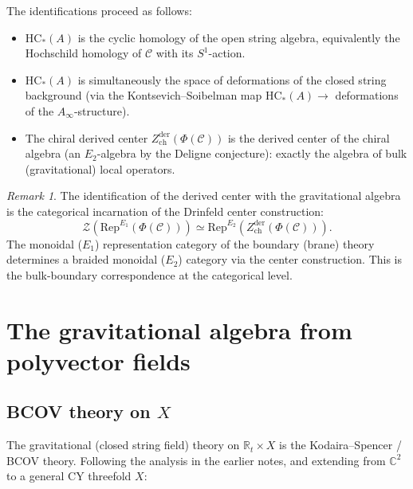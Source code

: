 \documentclass[11pt]{article}
\theoremstyle{definition}
\theoremstyle{remark}
\newtheorem{remark}[theorem]{Remark}
\newcommand{\HC}{\mathrm{HC}}
\newcommand{\Ainf}{A_\infty}
\newcommand{\Rep}{\mathrm{Rep}}
\newcommand{\cC}{\mathcal{C}}
\newcommand{\cZ}{\mathcal{Z}}
\newcommand{\Etwo}{E_2}
\begin{document}
The identifications proceed as follows:
\begin{itemize}
 \item $\HC_*(A)$ is the cyclic homology of the open string algebra,
 equivalently the Hochschild homology of $\cC$ with its $S^1$-action.
 \item $\HC_*(A)$ is simultaneously the space of deformations of the closed
 string background (via the Kontsevich--Soibelman map $\HC_*(A) \to$
 deformations of the $\Ainf$-structure).
 \item The chiral derived center $Z^{\mathrm{der}}_{\mathrm{ch}}(\Phi(\cC))$
 is the derived center of the chiral algebra (an $\Etwo$-algebra by the
 Deligne conjecture): exactly the algebra of bulk
 (gravitational) local operators.
\end{itemize}

\begin{remark}
The identification of the derived center with the gravitational algebra is the
categorical incarnation of the Drinfeld center construction:
\[
 \cZ(\Rep^{E_1}(\Phi(\cC)))
 \simeq \Rep^{E_2}(Z^{\mathrm{der}}_{\mathrm{ch}}(\Phi(\cC))).
\]
The monoidal ($E_1$) representation category of the boundary (brane) theory
determines a braided monoidal ($E_2$) category via the center construction.
This is the bulk-boundary correspondence at the categorical level.
\end{remark}


\section{The gravitational algebra from polyvector fields}
\label{sec:grav-algebra}

\subsection{BCOV theory on $X$}
\label{sec:bcov}

The gravitational (closed string field) theory on $\mathbb{R}_t \times X$ is
the Kodaira--Spencer / BCOV theory. Following the analysis in the earlier
notes, and extending from $\mathbb{C}^2$ to a general CY threefold $X$:
\end{document}
